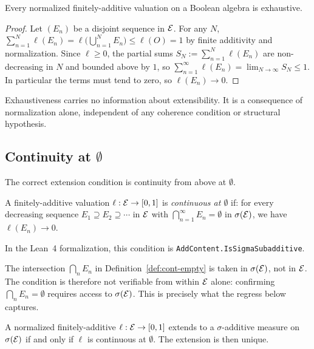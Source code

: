 \begin{proposition}
\label{prop:exhaustiveness-trivial}
Every normalized finitely-additive valuation on a Boolean algebra is exhaustive.
\end{proposition}

\begin{proof}
Let $(E_n)$ be a disjoint sequence in $\mathcal{E}$.  For any $N$,
$\sum_{n=1}^N \ell(E_n) = \ell\bigl(\bigcup_{n=1}^N E_n\bigr) \leq \ell(O) = 1$
by finite additivity and normalization.  Since $\ell \geq 0$, the partial sums
$S_N := \sum_{n=1}^N \ell(E_n)$ are non-decreasing in $N$ and bounded above by $1$,
so $\sum_{n=1}^\infty \ell(E_n) = \lim_{N \to \infty} S_N \leq 1$.
In particular the terms must tend to zero, so $\ell(E_n) \to 0$.
\end{proof}

\noindent Exhaustiveness carries no information about extensibility.  It is a
consequence of normalization alone, independent of any coherence condition or
structural hypothesis.

\subsection{Continuity at $\emptyset$}

The correct extension condition is continuity from above at $\emptyset$.

\begin{definition}
\label{def:cont-empty}
A finitely-additive valuation $\ell : \mathcal{E} \to [0,1]$ is \emph{continuous at
$\emptyset$} if: for every decreasing sequence $E_1 \supseteq E_2 \supseteq \cdots$
in $\mathcal{E}$ with $\bigcap_{n=1}^\infty E_n = \emptyset$ in $\sigma(\mathcal{E})$, we have $\ell(E_n)
\to 0$.
\end{definition}

\noindent In the Lean~4 formalization, this condition is \texttt{AddContent.IsSigmaSubadditive}.

\begin{remark}
The intersection $\bigcap_n E_n$ in Definition~\ref{def:cont-empty} is taken in
$\sigma(\mathcal{E})$, not in $\mathcal{E}$.  The condition is therefore not verifiable from within $\mathcal{E}$
alone: confirming $\bigcap_n E_n = \emptyset$ requires access to $\sigma(\mathcal{E})$.  This
is precisely what the regress below captures.
\end{remark}

\begin{theorem}
\label{thm:extension-criterion}
A normalized finitely-additive $\ell : \mathcal{E} \to [0,1]$ extends to a $\sigma$-additive
measure on $\sigma(\mathcal{E})$ if and only if $\ell$ is continuous at $\emptyset$.  The extension
is then unique.
\end{theorem}

